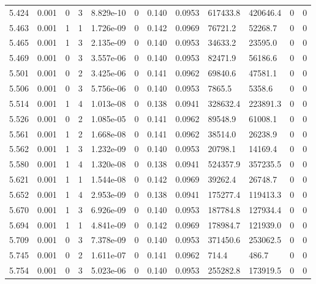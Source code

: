 \documentclass[preview]{standalone}
\begin{document}
{{{{{{{{\begin{tabular}{L{1.2cm}C{1.2cm} C{0.3cm}C{0.5cm} C{1.4cm}C{1.4cm} C{1.4cm}C{1.4cm} C{1.6cm}C{1.6cm} C{1.6cm}C{1.6cm}}
  5.424  &  0.001  & 0     &  3 &  8.829e-10  & 0  &  0.140&   0.0953& 617433.8 & 420646.4   &  0 & 0  \\ 
  5.463  &  0.001  & 1     &  1 &  1.726e-09  & 0  &  0.142&   0.0969& 76721.2 & 52268.7   &  0 & 0  \\ 
  5.465  &  0.001  & 1     &  3 &  2.135e-09  & 0  &  0.140&   0.0953& 34633.2 & 23595.0   &  0 & 0  \\ 
  5.469  &  0.001  & 0     &  3 &  3.557e-06  & 0  &  0.140&   0.0953& 82471.9 & 56186.6   &  0 & 0  \\ 
  5.501  &  0.001  & 0     &  2 &  3.425e-06  & 0  &  0.141&   0.0962& 69840.6 & 47581.1   &  0 & 0  \\ 
  5.506  &  0.001  & 0     &  3 &  5.756e-06  & 0  &  0.140&   0.0953& 7865.5 & 5358.6   &  0 & 0  \\ 
  5.514  &  0.001  & 1     &  4 &  1.013e-08  & 0  &  0.138&   0.0941& 328632.4 & 223891.3   &  0 & 0  \\ 
  5.526  &  0.001  & 0     &  2 &  1.085e-05  & 0  &  0.141&   0.0962& 89548.9 & 61008.1   &  0 & 0  \\ 
  5.561  &  0.001  & 1     &  2 &  1.668e-08  & 0  &  0.141&   0.0962& 38514.0 & 26238.9   &  0 & 0  \\ 
  5.562  &  0.001  & 1     &  3 &  1.232e-09  & 0  &  0.140&   0.0953& 20798.1 & 14169.4   &  0 & 0  \\ 
  5.580  &  0.001  & 1     &  4 &  1.320e-08  & 0  &  0.138&   0.0941& 524357.9 & 357235.5   &  0 & 0  \\ 
  5.621  &  0.001  & 1     &  1 &  1.544e-08  & 0  &  0.142&   0.0969& 39262.4 & 26748.7   &  0 & 0  \\ 
  5.652  &  0.001  & 1     &  4 &  2.953e-09  & 0  &  0.138&   0.0941& 175277.4 & 119413.3   &  0 & 0  \\ 
  5.670  &  0.001  & 1     &  3 &  6.926e-09  & 0  &  0.140&   0.0953& 187784.8 & 127934.4   &  0 & 0  \\ 
  5.694  &  0.001  & 1     &  1 &  4.841e-09  & 0  &  0.142&   0.0969& 178984.7 & 121939.0   &  0 & 0  \\ 
  5.709  &  0.001  & 0     &  3 &  7.378e-09  & 0  &  0.140&   0.0953& 371450.6 & 253062.5   &  0 & 0  \\ 
  5.745  &  0.001  & 0     &  2 &  1.611e-07  & 0  &  0.141&   0.0962& 714.4 & 486.7   &  0 & 0  \\ 
  5.754  &  0.001  & 0     &  3 &  5.023e-06  & 0  &  0.140&   0.0953& 255282.8 & 173919.5   &  0 & 0  \\ 

\end{tabular}}}}}}}}}
\end{document}
